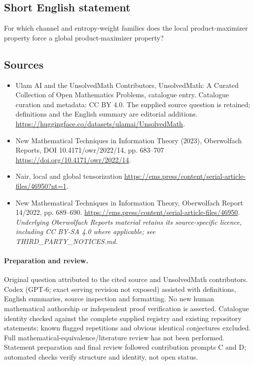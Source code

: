 \documentclass[11pt]{article}
\begin{document}
\subsection{Short English statement}
For which channel and entropy-weight families does the local product-maximizer property force a global product-maximizer property?
\subsection{Sources}
\begin{itemize}
\item[\hypertarget{source:statement:1}{S1}] Ulam AI and the UnsolvedMath Contributors, UnsolvedMath: A Curated Collection of Open Mathematics Problems, catalogue entry. Catalogue curation and metadata: CC BY 4.0. The supplied source question is retained; definitions and the English summary are editorial additions.
\url{https://huggingface.co/datasets/ulamai/UnsolvedMath}.
\item[\hypertarget{source:statement:2}{S2}] New Mathematical Techniques in Information Theory (2023), Oberwolfach Reports, DOI 10.4171/owr/2022/14, pp. 683--707
\url{https://doi.org/10.4171/owr/2022/14}.
\item[\hypertarget{source:statement:3}{S3}] Nair, local and global tensorization
\url{https://ems.press/content/serial-article-files/46950?nt=1}.
\item[\hypertarget{source:statement:4}{S4}] New Mathematical Techniques in Information Theory, Oberwolfach Report 14/2022, pp. 689--690.
\url{https://ems.press/content/serial-article-files/46950}.
\textit{Underlying Oberwolfach Reports material retains its source-specific licence, including CC BY-SA 4.0 where applicable; see THIRD\_PARTY\_NOTICES.md.}
\end{itemize}
\paragraph{Preparation and review.}
Original question attributed to the cited source and UnsolvedMath contributors. Codex (GPT-6; exact serving revision not exposed) assisted with definitions, English summaries, source inspection and formatting. No new human mathematical authorship or independent proof verification is asserted. Catalogue identity checked against the complete supplied registry and existing repository statements; known flagged repetitions and obvious identical conjectures excluded. Full mathematical-equivalence/literature review has not been performed. Statement preparation and final review followed contribution prompts C and D; automated checks verify structure and identity, not open status.
\label{end:statement}
\end{document}
